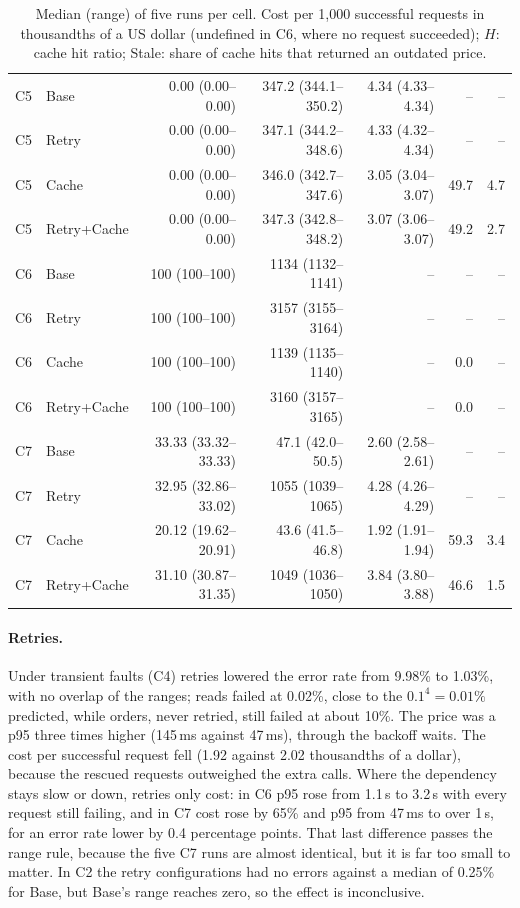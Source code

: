 \documentclass[10pt]{article}
\begin{document}
\begin{table}[p]
\begin{tabular}{@{}llrrrrr@{}}
\midrule
C5 & Base        & 0.00 (0.00--0.00)  & 347.2 (344.1--350.2) & 4.34 (4.33--4.34) & --   & --   \\
C5 & Retry       & 0.00 (0.00--0.00)  & 347.1 (344.2--348.6) & 4.33 (4.32--4.34) & --   & --   \\
C5 & Cache       & 0.00 (0.00--0.00)  & 346.0 (342.7--347.6) & 3.05 (3.04--3.07) & 49.7 & 4.7  \\
C5 & Retry+Cache & 0.00 (0.00--0.00)  & 347.3 (342.8--348.2) & 3.07 (3.06--3.07) & 49.2 & 2.7  \\
\midrule
C6 & Base        & 100 (100--100)     & 1134 (1132--1141)   & --                & --    & --   \\
C6 & Retry       & 100 (100--100)     & 3157 (3155--3164)   & --                & --    & --   \\
C6 & Cache       & 100 (100--100)     & 1139 (1135--1140)   & --                & 0.0   & --   \\
C6 & Retry+Cache & 100 (100--100)     & 3160 (3157--3165)   & --                & 0.0   & --   \\
\midrule
C7 & Base        & 33.33 (33.32--33.33) & 47.1 (42.0--50.5) & 2.60 (2.58--2.61) & --    & --   \\
C7 & Retry       & 32.95 (32.86--33.02) & 1055 (1039--1065) & 4.28 (4.26--4.29) & --    & --   \\
C7 & Cache       & 20.12 (19.62--20.91) & 43.6 (41.5--46.8) & 1.92 (1.91--1.94) & 59.3  & 3.4  \\
C7 & Retry+Cache & 31.10 (30.87--31.35) & 1049 (1036--1050) & 3.84 (3.80--3.88) & 46.6  & 1.5  \\
\bottomrule
\end{tabular}
\caption{Median (range) of five runs per cell. Cost per 1{,}000 successful
requests in thousandths of a US dollar (undefined in C6, where no request
succeeded); $H$: cache hit ratio; Stale: share of cache hits that returned an
outdated price.}
\label{tab:effects}
\end{table}

\paragraph{Retries.} Under transient faults (C4) retries lowered the error rate
from 9.98\% to 1.03\%, with no overlap of the ranges; reads failed at 0.02\%,
close to the $0.1^4 = 0.01\%$ predicted, while orders, never retried, still
failed at about 10\%. The price was a p95 three times higher (145\,ms against
47\,ms), through the backoff waits. The cost per successful request fell
(1.92 against 2.02 thousandths of a dollar), because the rescued requests
outweighed the extra calls. Where the dependency stays slow or down, retries
only cost: in C6 p95 rose from 1.1\,s to 3.2\,s with every request still
failing, and in C7 cost rose by 65\% and p95 from 47\,ms to over 1\,s, for an
error rate lower by 0.4 percentage points. That last difference passes the range
rule, because the five C7 runs are almost identical, but it is far too small to
matter. In C2 the retry configurations had no errors against a median of 0.25\%
for Base, but Base's range reaches zero, so the effect is inconclusive.
\end{document}
